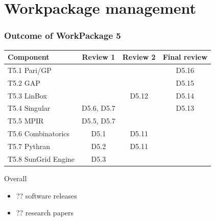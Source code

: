 \documentclass{beamer}
\begin{document}
\section{Workpackage management}
\begin{frame}
  \frametitle{Outcome of WorkPackage 5}

  \begin{tabular}{lccc}
    \toprule
    Component & Review 1 & Review 2 & Final review\\
    \midrule
    T5.1 Pari/GP & & & {\color{green} D5.16} \\
    T5.2 GAP     & & & {\color{green} D5.15} \\
    T5.3 LinBox  & & \alert{D5.12} & {\color{green} D5.14} \\
    T5.4 Singular& D5.6, D5.7 & & {\color{green} D5.13} \\
    T5.5 MPIR    & D5.5, D5.7& & \\
    T5.6 Combinatorics  & D5.1& \alert{D5.11} & \\
    T5.7 Pythran        & D5.2 & \alert{D5.11} & \\
    T5.8 SunGrid Engine & D5.3 & & \\
    \bottomrule
    
  \end{tabular}

  \vspace{1em}
  
  Overall
  \begin{itemize}
  \item ?? software releases
  \item ?? research papers
  \end{itemize}
\end{frame}

\end{document}
